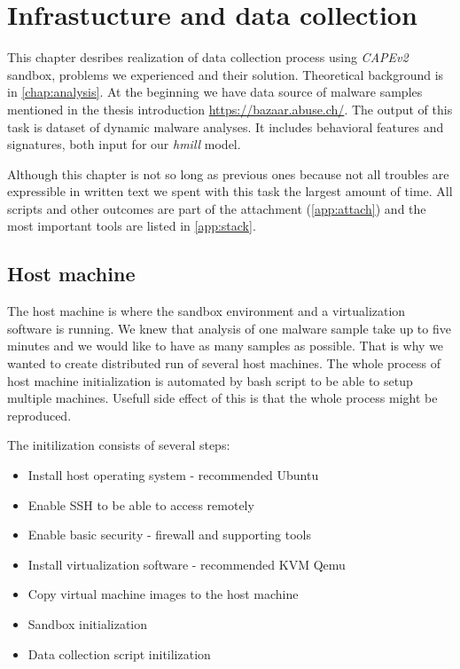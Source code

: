 \chapter{Infrastucture and data collection} \label{chap:infrastructure}
This chapter desribes realization of data collection process using \emph{CAPEv2} sandbox, problems we experienced and their solution. Theoretical background is in \ref{chap:analysis}. At the beginning we have data source of malware samples mentioned in the thesis introduction \url{https://bazaar.abuse.ch/}. The output of this task is dataset of dynamic malware analyses. It includes behavioral features and signatures, both input for our \emph{hmill} model.

Although this chapter is not so long as previous ones because not all troubles are expressible in written text we spent with this task the largest amount of time. All scripts and other outcomes are part of the attachment (\ref{app:attach}) and the most important tools are listed in \ref{app:stack}.

\section{Host machine}
The host machine is where the sandbox environment and a virtualization software is running. We knew that analysis of one malware sample take up to five minutes and we would like to have as many samples as possible. That is why we wanted to create distributed run of several host machines. The whole process of host machine initialization is automated by bash script to be able to setup multiple machines. Usefull side effect of this is that the whole process might be reproduced.

The initilization consists of several steps:
\begin{itemize}
    \item Install host operating system - recommended Ubuntu
    \item Enable SSH to be able to access remotely
    \item Enable basic security - firewall and supporting tools
    \item Install virtualization software - recommended KVM Qemu
    \item Copy virtual machine images to the host machine
    \item Sandbox initialization
    \item Data collection script initilization
\end{itemize}


